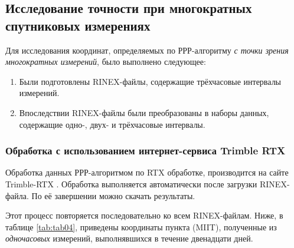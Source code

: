 \subsection[Влияние многократных измерений]{Исследование точности при многократных спутниковых измерениях}\label{subsec:ch2/sec3/sub1}

Для исследования координат, определяемых по РРР-алгоритму \textit{с точки зрения многократных измерений}, было выполнено следующее:
\begin{enumerate}
	\item Были подготовлены RINEX-файлы, содержащие трёхчасовые интервалы измерений. 
	\item Впоследствии RINEX-файлы были преобразованы в наборы данных, содержащие одно-, двух- и трёхчасовые интервалы.
\end{enumerate}

\subsubsection{Обработка с использованием интернет-сервиса Trimble RTX }\label{subsec:ch2/sec3/sub1/sub1}

Обработка данных РРР-алгоритмом по RTX обработке, производится на сайте Trimble-RTX \cite{src44}. Обработка выполняется автоматически после загрузки RINEX-файла. По её завершении можно скачать результаты.

Этот процесс повторяется последовательно ко всем RINEX-файлам. Ниже, в таблице \cref{tab:tab04}, приведены координаты пункта (MIIT), полученные из \textit{одночасовых} измерений, выполнявшихся в течение двенадцати дней.

